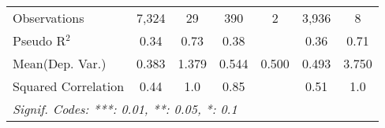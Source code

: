 \begin{tabular}{lcccccc}
   Observations                                               & 7,324      & 29      & 390           & 2    & 3,936   & 8\\  
   Pseudo R$^2$                                               & 0.34       & 0.73    & 0.38          &      & 0.36    & 0.71\\  
Mean(Dep. Var.) & 0.383 & 1.379 & 0.544 & 0.500 & 0.493 & 3.750 \\
   Squared Correlation                                        & 0.44       & 1.0     & 0.85          &      & 0.51    & 1.0\\  
   \midrule \midrule
   \multicolumn{7}{l}{\emph{Signif. Codes: ***: 0.01, **: 0.05, *: 0.1}}\\
\end{tabular}
\par\endgroup
